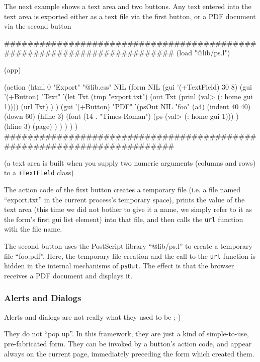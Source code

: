 The next example shows a text area and two buttons. Any text entered
into the text area is exported either as a text file via the first
button, or a PDF document via the second button


\begin{wideverbatim}
########################################################################
(load "@lib/ps.l")

(app)

(action
   (html 0 "Export" "@lib.css" NIL
      (form NIL
         (gui '(+TextField) 30 8)
         (gui '(+Button) "Text"
            '(let Txt (tmp "export.txt")
               (out Txt (prinl (val> (: home gui 1))))
               (url Txt) ) )
         (gui '(+Button) "PDF"
            '(psOut NIL "foo"
               (a4)
               (indent 40 40)
               (down 60)
               (hline 3)
               (font (14 . "Times-Roman")
                  (ps (val> (: home gui 1))) )
               (hline 3)
               (page) ) ) ) ) )
########################################################################
\end{wideverbatim}

(a text area is built when you supply two numeric arguments (columns and
rows) to a \texttt{+TextField} class)

The action code of the first button creates a temporary file (i.e. a
file named ``export.txt'' in the current process's temporary space),
prints the value of the text area (this time we did not bother to give
it a name, we simply refer to it as the form's first gui list element)
into that file, and then calls the \texttt{url} function with the file name.

The second button uses the PostScript library ``@lib/ps.l'' to create a
temporary file ``foo.pdf''. Here, the temporary file creation and the call
to the \texttt{url} function is hidden in the internal mechanisms of \texttt{psOut}.
The effect is that the browser receives a PDF document and displays it.


\subsubsection{ Alerts and Dialogs}
\label{sec:appl-devel-alerts-and-dialogs}%

Alerts and dialogs are not really what they used to be ;-)

They do not ``pop up''. In this framework, they are just a kind of
simple-to-use, pre-fabricated form. They can be invoked by a button's
action code, and appear always on the current page, immediately
preceding the form which created them.

